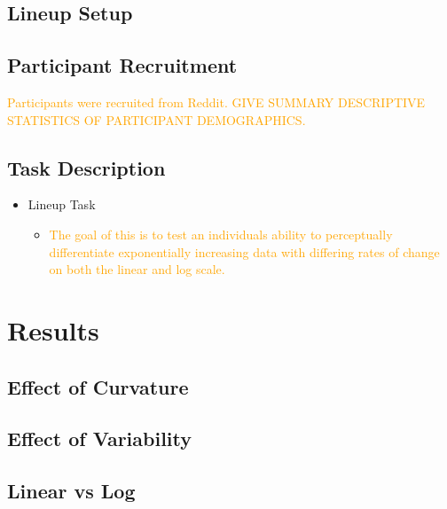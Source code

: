 \documentclass[]{interact}
\theoremstyle{plain}%
\theoremstyle{definition}
\theoremstyle{remark}
\begin{document}
\hypertarget{lineup-setup}{%
\subsection{Lineup Setup}\label{lineup-setup}}

\hypertarget{participant-recruitment}{%
\subsection{Participant Recruitment}\label{participant-recruitment}}

\textcolor{Orange}{Participants were recruited from Reddit. GIVE SUMMARY DESCRIPTIVE STATISTICS OF PARTICIPANT DEMOGRAPHICS.}

\hypertarget{task-description}{%
\subsection{Task Description}\label{task-description}}

\begin{itemize}
\item
  Lineup Task

  \begin{itemize}
  \item
    \textcolor{Orange}{The goal of this is to test an individuals ability to perceptually differentiate exponentially increasing data with differing rates of change on both the linear and log scale.}
  \end{itemize}
\end{itemize}

\hypertarget{results}{%
\section{Results}\label{results}}

\hypertarget{effect-of-curvature}{%
\subsection{Effect of Curvature}\label{effect-of-curvature}}

\hypertarget{effect-of-variability}{%
\subsection{Effect of Variability}\label{effect-of-variability}}

\hypertarget{linear-vs-log}{%
\subsection{Linear vs Log}\label{linear-vs-log}}
\end{document}
